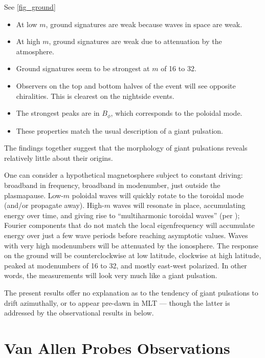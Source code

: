 \documentclass{article}
\newcommand{\azm}{\ensuremath{m}\xspace}
\begin{document}
See \cref{fig_ground}

\begin{itemize}
    \item At low \azm, ground signatures are weak because waves in space are weak. 
    \item At high \azm, ground signatures are weak due to attenuation by the atmosphere. 
    \item Ground signatures seem to be strongest at \azm of 16 to 32. 
    \item Observers on the top and bottom halves of the event will see opposite chiralities. This is clearest on the nightside events. 
    \item The strongest peaks are in $B_\phi$, which corresponds to the poloidal mode. 
    \item These properties match the usual description of a giant pulsation. 
\end{itemize}

The findings together suggest that the morphology of giant
pulsations reveals relatively little about their origins. 

One can consider a hypothetical magnetosphere subject to constant
driving: broadband in frequency, broadband in modenumber, just outside
the plasmapause. Low-\azm poloidal waves will quickly rotate to the
toroidal mode (and/or propagate away). High-\azm waves will resonate in
place, accumulating energy over time, and giving rise to ``multiharmonic
toroidal waves'' (per \cite{takahashi_2011}); Fourier components that do
not match the local eigenfrequency will accumulate energy over just a
few wave periods before reaching asymptotic values. Waves with very high
modenumbers will be attenuated by the ionosphere. The response on the
ground will be counterclockwise at low latitude, clockwise at high
latitude, peaked at modenumbers of 16 to 32, and mostly east-west
polarized. In other words, the measurements will look very much like a
giant pulsation. 

The present results offer no explanation as to the tendency of giant
pulsations to drift azimuthally, or to appear pre-dawn in MLT --- though
the latter is addressed by the observational results in below. 


\section{Van Allen Probes Observations}
\end{document}
